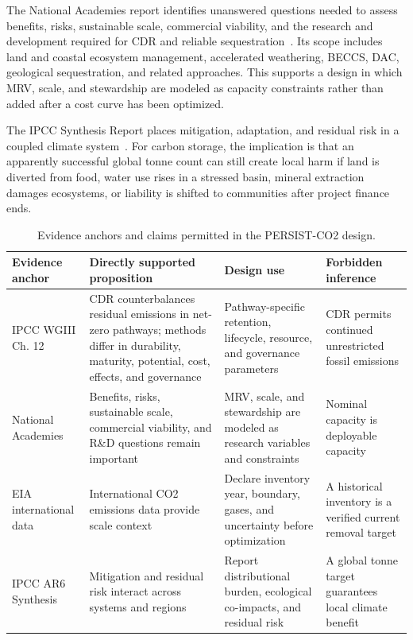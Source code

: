 \documentclass[conference]{IEEEtran}
\begin{document}
The National Academies report identifies unanswered questions needed to assess benefits, risks, sustainable scale, commercial viability, and the research and development required for CDR and reliable sequestration~\cite{nas2019}. Its scope includes land and coastal ecosystem management, accelerated weathering, BECCS, DAC, geological sequestration, and related approaches. This supports a design in which MRV, scale, and stewardship are modeled as capacity constraints rather than added after a cost curve has been optimized.

The IPCC Synthesis Report places mitigation, adaptation, and residual risk in a coupled climate system~\cite{ipccsyr}. For carbon storage, the implication is that an apparently successful global tonne count can still create local harm if land is diverted from food, water use rises in a stressed basin, mineral extraction damages ecosystems, or liability is shifted to communities after project finance ends.

\begin{table}[t]
\centering
\caption{Evidence anchors and claims permitted in the PERSIST-CO2 design.}
\label{tab:evidence}
\small
\begin{tabular}{P{2.8cm}P{4.3cm}P{4.7cm}P{3.2cm}}
\toprule
Evidence anchor & Directly supported proposition & Design use & Forbidden inference \\
\midrule
IPCC WGIII Ch. 12~\cite{ipccwg3} & CDR counterbalances residual emissions in net-zero pathways; methods differ in durability, maturity, potential, cost, effects, and governance & Pathway-specific retention, lifecycle, resource, and governance parameters & CDR permits continued unrestricted fossil emissions \\
National Academies~\cite{nas2019} & Benefits, risks, sustainable scale, commercial viability, and R\&D questions remain important & MRV, scale, and stewardship are modeled as research variables and constraints & Nominal capacity is deployable capacity \\
EIA international data~\cite{eia} & International CO2 emissions data provide scale context & Declare inventory year, boundary, gases, and uncertainty before optimization & A historical inventory is a verified current removal target \\
IPCC AR6 Synthesis~\cite{ipccsyr} & Mitigation and residual risk interact across systems and regions & Report distributional burden, ecological co-impacts, and residual risk & A global tonne target guarantees local climate benefit \\
\bottomrule
\end{tabular}
\end{table}
\end{document}
